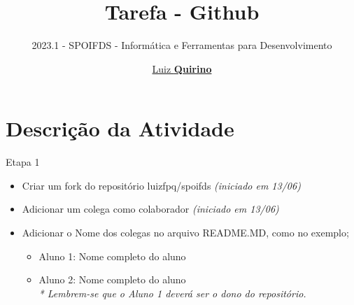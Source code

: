 \documentclass{beamer}
\title{Tarefa - Github}
\subtitle{2023.1 - SPOIFDS - Informática e Ferramentas para Desenvolvimento }
\author{\href{mailto:luizfpq@gmail.com}{Luiz \textbf{Quirino}}}
\newcommand{\hrefcol}[2]{\textcolor{cyan}{\href{#1}{#2}}}
\begin{document}
\maketitle

%
%




\section{Descrição da Atividade}
\begin{frame}{Etapa 1}
      \begin{itemize}
            \item Criar um fork do repositório luizfpq/spoifds \textit{(iniciado em 13/06)}
            \item Adicionar um colega como colaborador \textit{(iniciado em 13/06)}
            \item Adicionar o Nome dos colegas no arquivo README.MD, como no exemplo;
            \begin{itemize}
                  \item Aluno 1: Nome completo do aluno
                  \item Aluno 2: Nome completo do aluno
                  \\ \textit{* Lembrem-se que o Aluno 1 deverá ser o dono do repositório.}
            \end{itemize}
      \end{itemize}
\end{frame}
\end{document}
